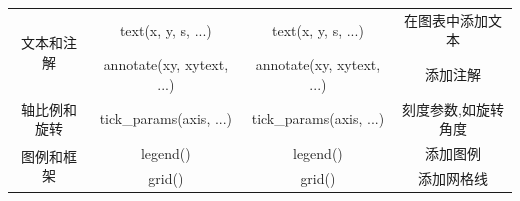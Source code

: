 \documentclass[12pt]{article}
\begin{document}
\begin{table}[H]
\begin{tabular}{|c|c|c|c|}
\multirow{2}{*}{文本和注解} & text(x, y, s, ...)            & text(x, y, s, ...)            & 在图表中添加文本     \\ \cline{2-4} 
                       & annotate(xy, xytext, ...)     & annotate(xy, xytext, ...)     & 添加注解         \\ \hline
轴比例和旋转                 & tick\_params(axis, ...)       & tick\_params(axis, ...)       & 刻度参数,如旋转角度 \\ \hline
\multirow{2}{*}{图例和框架} & legend()                      & legend()                      & 添加图例         \\ \cline{2-4} 
                       & grid()                        & grid()                        & 添加网格线        \\ \hline
\end{tabular}
\end{table}
\end{document}
